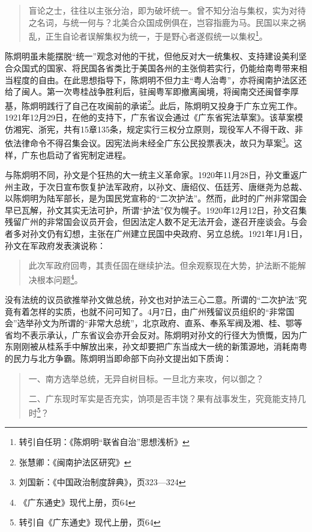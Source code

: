 \begin{quote}

盲论之士，往往以主张分治，即为破坏统一。曾不知分治与集权，实为对待之名词，与统一何与？北美合众国成例俱在，岂容指鹿为马。民国以来之祸乱，正生自论者误解集权为统一，于是野心者遂假统一以集权\footnote{转引自任玥：《陈炯明“联省自治”思想浅析》}。

\end{quote}

陈炯明虽未能摆脱“统一”观念对他的干扰，但他反对大一统集权、支持建设美利坚合众国式的国家、将民国各省类比于美国各州的主张倘若实行，仍能给南粤带来相当程度的自由。在此思想指导下，陈炯明不但力主“粤人治粤”，亦将闽南护法区还给了闽人。第一次粤桂战争胜利后，驻闽粤军即撤离闽境，将闽南交还闽督李厚基，陈炯明践行了自己在攻闽前的承诺\footnote{张慧卿：《闽南护法区研究》}。此后，陈炯明又投身于广东立宪工作。1921年12月29日，在他的支持下，广东省议会通过《广东省宪法草案》。该草案模仿湘宪、浙宪，共有15章135条，规定实行三权分立原则，现役军人不得干政、非依法律命令不得召集会议。因宪法尚未经全广东公民投票表决，故只为草案\footnote{刘国新：《中国政治制度辞典》，页323—324}。这样，广东也启动了省宪制定进程。

与陈炯明不同，孙文是个狂热的大一统主义革命家。1920年11月28日，孙文重返广州主政，于次日宣布恢复护法军政府，以孙文、唐绍仪、伍廷芳、唐继尧为总裁、以陈炯明为陆军部长，是为国民党宣称的“二次护法”。然而，此时的广州非常国会早已瓦解，孙文其实无法可护，所谓“护法”仅为幌子。1920年12月12日，孙文召集残留广州的非常国会议员开会，但因法定人数不足无法开会，遂召开座谈会。与会者多对孙文仍有幻想，主张在广州建立民国中央政府、另立总统。1921年1月1日，孙文在军政府发表演说称：



\begin{quote}
此次军政府回粤，其责任固在继续护法。但余观察现在大势，护法断不能解决根本问题\footnote{《广东通史》现代上册，页64}。
\end{quote}

没有法统的议员欲推举孙文做总统，孙文也对护法三心二意。所谓的“二次护法”究竟有着怎样的实质，也就不问可知了。4月7日，由广州残留议员组织的“非常国会”选举孙文为所谓的“非常大总统”，北京政府、直系、奉系军阀及湘、桂、鄂等省均不表示承认，广东省议会亦开会反对。陈炯明对孙文的行径大为愤慨，因为广东刚刚被从桂系手中解放出来，孙文却要把广东当成大一统的新策源地，消耗南粤的民力与北方争霸。陈炯明当即命部下向孙文提出如下质询：

\begin{quote}
一、南方选举总统，无异自树目标。一旦北方来攻，何以御之？

二、广东现时军实是否充实，饷项是否丰饶？果有战事发生，究竟能支持几时\footnote{转引自《广东通史》现代上册，页64}？
\end{quote}

